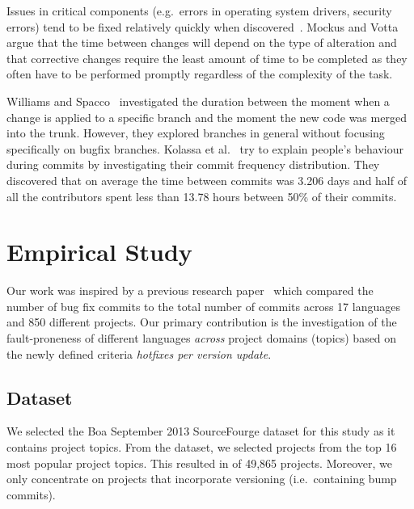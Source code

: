 \documentclass{sig-alternate}
\begin{document}
Issues in critical components (e.g.~errors in operating system drivers, security errors) tend to be fixed relatively quickly when discovered~\cite{Livshits2005}. Mockus and Votta~\cite{Mockus2000} argue that the time between changes will depend on the type of alteration and that corrective changes require the least amount of time to be completed as they often have to be performed promptly regardless of the complexity of the task.

Williams and Spacco~\cite{Williams2008} investigated the duration between the moment when a change is applied to a specific branch and the moment the new code was merged into the trunk. However, they explored branches in general without focusing specifically on bugfix branches. Kolassa et al.~\cite{Kolassa2013} try to explain people's behaviour during commits by investigating their commit frequency distribution. They discovered that on average the time between commits was 3.206 days and half of all the contributors spent less than 13.78 hours between 50\% of their commits.



\section{Empirical Study}


Our work was inspired by a previous research paper~\cite{Ray2014} which compared the number of bug fix commits to the total number of commits across 17 languages and 850 different projects. Our primary contribution is the investigation of the fault-proneness of different languages \emph{across} project domains (topics) based on the newly defined criteria \emph{hotfixes per version update}. 

\subsection{Dataset}
We selected the Boa September 2013 SourceFourge dataset for this study as it contains project topics. From the dataset, we selected projects from the top 16 most popular project topics. This resulted in of 49,865 projects. Moreover, we only concentrate on projects that incorporate versioning (i.e.\ containing bump commits).
\end{document}
